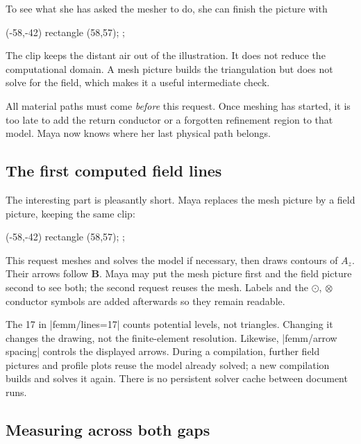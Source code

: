To see what she has asked the mesher to do, she can finish the picture with
\begin{codeexample}
\begin{scope}
  \clip (-58,-42) rectangle (58,57);
  ;
\end{scope}
\end{codeexample}
The clip keeps the distant air out of the illustration. It does not reduce
the computational domain. A mesh picture builds the triangulation but does
not solve for the field, which makes it a useful intermediate check.

All material paths must come \emph{before} this request. Once meshing has
started, it is too late to add the return conductor or a forgotten refinement
region to that model. Maya now knows where her last physical path belongs.

\subsection{The first computed field lines}

The interesting part is pleasantly short. Maya replaces the mesh picture
by a field picture, keeping the same clip:
\begin{codeexample}
\begin{scope}
  \clip (-58,-42) rectangle (58,57);
  ;
\end{scope}
\end{codeexample}
This request meshes and solves the model if necessary, then draws contours of
$A_z$. Their arrows follow $\mathbf B$. Maya may put the mesh picture first
and the field picture second to see both; the second request reuses the mesh.
Labels and the $\odot$, $\otimes$ conductor symbols are added afterwards so
they remain readable.

The 17 in |femm/lines=17| counts potential levels, not triangles. Changing it
changes the drawing, not the finite-element resolution. Likewise,
|femm/arrow spacing| controls the displayed arrows. During a compilation,
further field pictures and profile plots reuse the model already solved;
a new compilation builds and solves it again. There is no persistent solver
cache between document runs.

\subsection{Measuring across both gaps}


